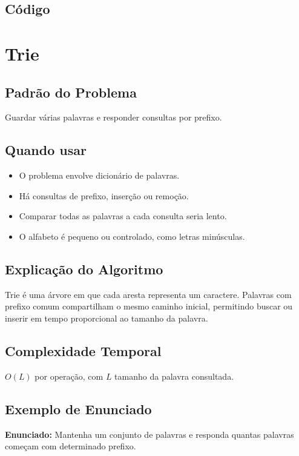 \subsection{Código}

\section{Trie}

\subsection{Padrão do Problema}
Guardar várias palavras e responder consultas por prefixo.

\subsection{Quando usar}
\begin{itemize}[nosep]
  \item O problema envolve dicionário de palavras.
  \item Há consultas de prefixo, inserção ou remoção.
  \item Comparar todas as palavras a cada consulta seria lento.
  \item O alfabeto é pequeno ou controlado, como letras minúsculas.
\end{itemize}

\subsection{Explicação do Algoritmo}
Trie é uma árvore em que cada aresta representa um caractere. Palavras com prefixo comum compartilham o mesmo caminho inicial, permitindo buscar ou inserir em tempo proporcional ao tamanho da palavra.

\subsection{Complexidade Temporal}
$O(L)$ por operação, com $L$ tamanho da palavra consultada.

\subsection{Exemplo de Enunciado}
\begin{exemplodiabox}
\textbf{Enunciado:} Mantenha um conjunto de palavras e responda quantas palavras começam com determinado prefixo.
\end{exemplodiabox}

